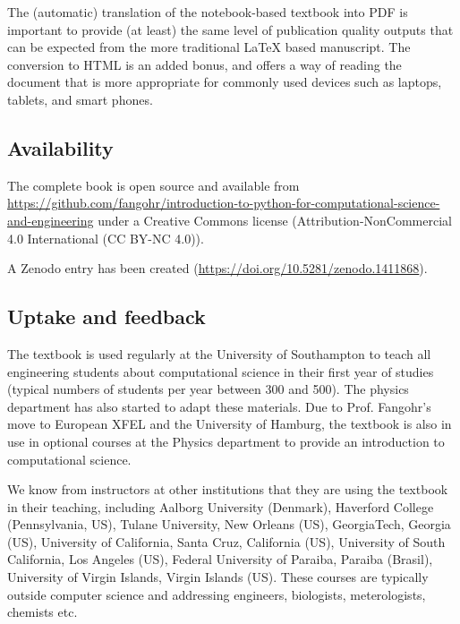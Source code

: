 \documentclass{deliverablereport}
\begin{document}
The (automatic) translation of the \Jupyter notebook-based textbook
into PDF is important to provide (at least) the same level of
publication quality outputs that can be expected from the more
traditional \LaTeX{} based manuscript. The conversion to HTML is an
added bonus, and offers a way of reading the document that is more
appropriate for commonly used devices such as laptops, tablets, and
smart phones.


\subsection{Availability}

The complete book is open source and available from\newline
{\tiny\url{https://github.com/fangohr/introduction-to-python-for-computational-science-and-engineering}}\linebreak
under a Creative Commons license (Attribution-NonCommercial 4.0
International (CC BY-NC 4.0)).

A Zenodo entry has been created (\url{https://doi.org/10.5281/zenodo.1411868}).

\subsection{Uptake and feedback}

The textbook is used regularly at the University of Southampton to
teach all engineering students about computational science in their
first year of studies (typical numbers of students per year between
300 and 500). The physics department has also started to adapt these
materials. Due to Prof. Fangohr's move to European XFEL and the
University of Hamburg, the textbook is also in use in optional
courses at the Physics department to provide an introduction to
computational science.

We know from instructors at other institutions that they are using the
textbook in their teaching, including Aalborg University (Denmark),
Haverford College (Pennsylvania, US), Tulane University, New Orleans
(US), GeorgiaTech, Georgia (US), University of California, Santa Cruz,
California (US), University of South California, Los Angeles
(US), Federal University of Paraiba, Paraiba (Brasil), University of
Virgin Islands, Virgin Islands (US). These courses are typically
outside computer science and addressing engineers, biologists,
meterologists, chemists etc.
\end{document}
